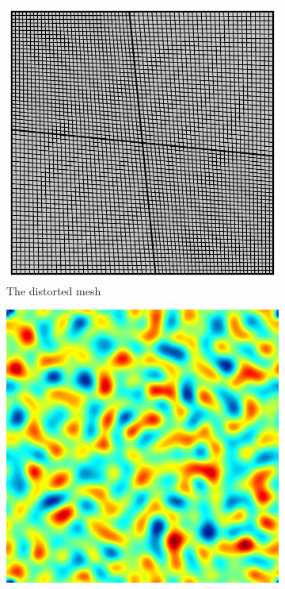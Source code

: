 \begin{figure}[ht]
	\center
	\captionsetup[subfigure]{labelformat=empty}
	\begin{subfigure}[t]{.3\linewidth}
		\center
		\includegraphics[scale=.431]{phase_field_domain}
		\vspace{-.4\baselineskip}
		\caption{The distorted mesh}
	\end{subfigure}
	\begin{subfigure}[t]{.3\linewidth}
		\center
		\includegraphics[scale=.25]{stochastic_ch_1_2}

\end{subfigure}
\end{figure}
